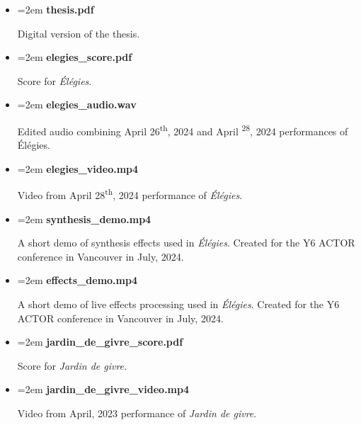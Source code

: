 \documentclass[12pt,twoside,maitrise]{dms_ks}
\theoremstyle{definition}
\begin{document}
{\begin{itemize}
    \item \hangindent=2em \textbf{thesis.pdf}
    \par Digital version of the thesis.
     
    \item \hangindent=2em \textbf{elegies\_score.pdf}
    \par Score for \textit{Élégies}.
    
    \item \hangindent=2em \textbf{elegies\_audio.wav}
    \par Edited audio combining April 26\textsuperscript{th}, 2024 and April \textsuperscript{28}, 2024 performances of Élégies.
    
    \item \hangindent=2em \textbf{elegies\_video.mp4}
    \par Video from April 28\textsuperscript{th}, 2024 performance of \textit{Élégies}.
    
    \item \hangindent=2em \textbf{synthesis\_demo.mp4}
    \par A short demo of synthesis effects used in \textit{Élégies}. Created for the Y6 ACTOR conference in Vancouver in July, 2024.
    
    \item \hangindent=2em \textbf{effects\_demo.mp4}
    \par A short demo of live effects processing used in \textit{Élégies}. Created for the Y6 ACTOR conference in Vancouver in July, 2024.

    \item \hangindent=2em \textbf{jardin\_de\_givre\_score.pdf}
    \par Score for \textit{Jardin de givre.}
    
    \item \hangindent=2em \textbf{jardin\_de\_givre\_video.mp4}
    \par Video from April, 2023 performance of \textit{Jardin de givre}.
\end{itemize}



}
\end{document}
